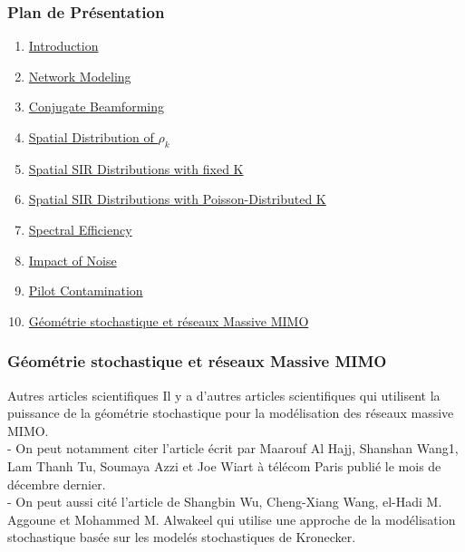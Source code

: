 \documentclass[pdf]{beamer}
\begin{document}
\begin{frame}
\frametitle{Plan de Présentation }
\begin{enumerate}
	\item \hyperlink{Introduction}{Introduction}
	\item \hyperlink{networkModeling}{Network Modeling}
	\item \hyperlink{conjugateBeamforming}{Conjugate Beamforming}
	\item \hyperlink{spatialDistribution}{Spatial Distribution of $\rho_k$}
	\item \hyperlink{spatialsir}{Spatial SIR Distributions with fixed K}
	\item \hyperlink{spatialsirk}{Spatial SIR Distributions with Poisson-Distributed K}
	\item \hyperlink{spectralEfficiency}{Spectral Efficiency}
	\item \hyperlink{impactOfNoise}{Impact of Noise}
	\item \hyperlink{piloteContamination}{Pilot Contamination}
	\item \hyperlink{autredoc}{Géométrie stochastique et réseaux Massive MIMO}
\end{enumerate}
\end{frame}

\begin{frame}[label=autredoc]
\frametitle{Géométrie stochastique et réseaux Massive MIMO}
\begin{exampleblock}{Autres articles scientifiques}
Il y a d'autres articles scientifiques qui utilisent la puissance de la géométrie stochastique pour la modélisation des réseaux massive MIMO.\\
- On peut notamment citer l'article {}  écrit par Maarouf Al Hajj, Shanshan Wang1, Lam Thanh Tu, Soumaya Azzi et Joe Wiart à télécom Paris publié le mois de décembre dernier.\\
- On peut aussi cité l'article {} de Shangbin Wu, Cheng-Xiang Wang, el-Hadi M. Aggoune et Mohammed M. Alwakeel qui utilise une approche de la modélisation stochastique basée sur les modelés stochastiques de Kronecker.

\end{exampleblock}
\end{frame}
\end{document}
